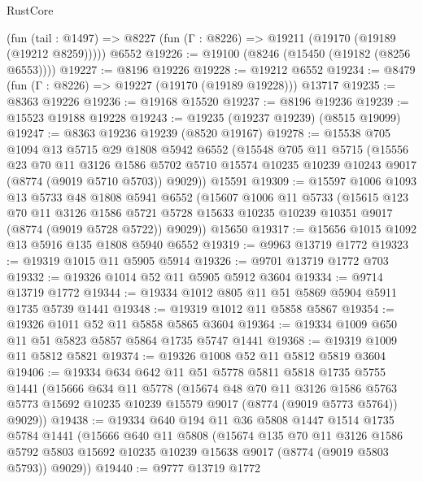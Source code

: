 \begin{lexlean}{RustCore}
\begin{coremodule}
    (fun (tail : @1497) => @8227 (fun (Γ : @8226) => @19211 (@19170 (@19189 (@19212 @8259)))))
    @6552
@19226 := @19100 (@8246 (@15450 (@19182 (@8256 @6553))))
@19227 := @8196 @19226
@19228 := @19212 @6552
@19234 := @8479 (fun (Γ : @8226) => @19227 (@19170 (@19189 @19228))) @13717
@19235 := @8363 @19226
@19236 := @19168 @15520
@19237 := @8196 @19236
@19239 := @15523 @19188 @19228
@19243 := @19235 (@19237 @19239) (@8515 @19099)
@19247 := @8363 @19236 @19239 (@8520 @19167)
@19278 := @15538
    @705
    @1094
    @13
    @5715
    @29
    @1808
    @5942
    @6552
    (@15548
      @705
      @11
      @5715
      (@15556
        @23
        @70
        @11
        @3126
        @1586
        @5702
        @5710
        @15574
        @10235
        @10239
        @10243
        @9017
        (@8774 (@9019 @5710 @5703))
        @9029))
    @15591
@19309 := @15597
    @1006
    @1093
    @13
    @5733
    @48
    @1808
    @5941
    @6552
    (@15607
      @1006
      @11
      @5733
      (@15615
        @123
        @70
        @11
        @3126
        @1586
        @5721
        @5728
        @15633
        @10235
        @10239
        @10351
        @9017
        (@8774 (@9019 @5728 @5722))
        @9029))
    @15650
@19317 := @15656 @1015 @1092 @13 @5916 @135 @1808 @5940 @6552
@19319 := @9963 @13719 @1772
@19323 := @19319 @1015 @11 @5905 @5914
@19326 := @9701 @13719 @1772 @703
@19332 := @19326 @1014 @52 @11 @5905 @5912 @3604
@19334 := @9714 @13719 @1772
@19344 := @19334 @1012 @805 @11 @51 @5869 @5904 @5911 @1735 @5739 @1441
@19348 := @19319 @1012 @11 @5858 @5867
@19354 := @19326 @1011 @52 @11 @5858 @5865 @3604
@19364 := @19334 @1009 @650 @11 @51 @5823 @5857 @5864 @1735 @5747 @1441
@19368 := @19319 @1009 @11 @5812 @5821
@19374 := @19326 @1008 @52 @11 @5812 @5819 @3604
@19406 := @19334
    @634
    @642
    @11
    @51
    @5778
    @5811
    @5818
    @1735
    @5755
    @1441
    (@15666
      @634
      @11
      @5778
      (@15674
        @48
        @70
        @11
        @3126
        @1586
        @5763
        @5773
        @15692
        @10235
        @10239
        @15579
        @9017
        (@8774 (@9019 @5773 @5764))
        @9029))
@19438 := @19334
    @640
    @194
    @11
    @36
    @5808
    @1447
    @1514
    @1735
    @5784
    @1441
    (@15666
      @640
      @11
      @5808
      (@15674
        @135
        @70
        @11
        @3126
        @1586
        @5792
        @5803
        @15692
        @10235
        @10239
        @15638
        @9017
        (@8774 (@9019 @5803 @5793))
        @9029))
@19440 := @9777 @13719 @1772

\end{coremodule}
\end{lexlean}
